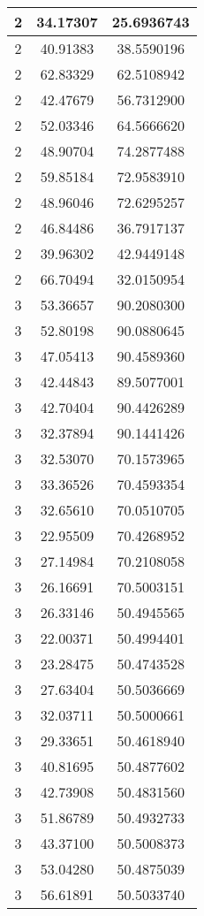 \documentclass[
]{book}
\begin{document}
\begin{tabular}{c|c|c}
\hline
2 & 34.17307 & 25.6936743\\
\hline
2 & 40.91383 & 38.5590196\\
\hline
2 & 62.83329 & 62.5108942\\
\hline
2 & 42.47679 & 56.7312900\\
\hline
2 & 52.03346 & 64.5666620\\
\hline
2 & 48.90704 & 74.2877488\\
\hline
2 & 59.85184 & 72.9583910\\
\hline
2 & 48.96046 & 72.6295257\\
\hline
2 & 46.84486 & 36.7917137\\
\hline
2 & 39.96302 & 42.9449148\\
\hline
2 & 66.70494 & 32.0150954\\
\hline
3 & 53.36657 & 90.2080300\\
\hline
3 & 52.80198 & 90.0880645\\
\hline
3 & 47.05413 & 90.4589360\\
\hline
3 & 42.44843 & 89.5077001\\
\hline
3 & 42.70404 & 90.4426289\\
\hline
3 & 32.37894 & 90.1441426\\
\hline
3 & 32.53070 & 70.1573965\\
\hline
3 & 33.36526 & 70.4593354\\
\hline
3 & 32.65610 & 70.0510705\\
\hline
3 & 22.95509 & 70.4268952\\
\hline
3 & 27.14984 & 70.2108058\\
\hline
3 & 26.16691 & 70.5003151\\
\hline
3 & 26.33146 & 50.4945565\\
\hline
3 & 22.00371 & 50.4994401\\
\hline
3 & 23.28475 & 50.4743528\\
\hline
3 & 27.63404 & 50.5036669\\
\hline
3 & 32.03711 & 50.5000661\\
\hline
3 & 29.33651 & 50.4618940\\
\hline
3 & 40.81695 & 50.4877602\\
\hline
3 & 42.73908 & 50.4831560\\
\hline
3 & 51.86789 & 50.4932733\\
\hline
3 & 43.37100 & 50.5008373\\
\hline
3 & 53.04280 & 50.4875039\\
\hline
3 & 56.61891 & 50.5033740\\

\end{tabular}
\end{document}

